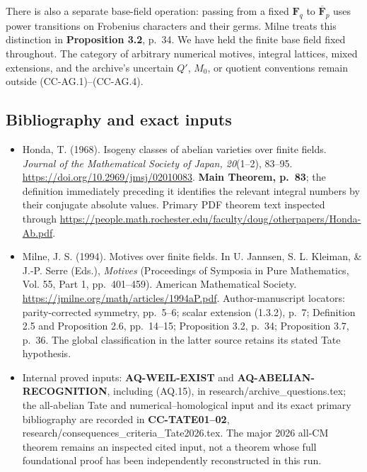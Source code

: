 \documentclass[11pt,a4paper]{article}
\providecommand{\tightlist}{\setlength{\itemsep}{0pt}\setlength{\parskip}{0pt}}
\theoremstyle{definition}\newtheorem{definition}[theorem]{Definition}
\theoremstyle{remark}\newtheorem{remark}[theorem]{Remark}
\begin{document}
There is also a separate base-field operation: passing from a fixed
\(\mathbf F_q\) to \(\overline{\mathbf F}_p\) uses power transitions on
Frobenius characters and their germs. Milne treats this distinction in
\textbf{Proposition 3.2}, p.~34. We have held the finite base field
fixed throughout. The category of arbitrary numerical motives, integral
lattices, mixed extensions, and the archive's uncertain \(Q'\), \(M_0\),
or quotient conventions remain outside (CC-AG.1)--(CC-AG.4).

\subsection{Bibliography and exact
inputs}\label{bibliography-and-exact-inputs}

\begin{itemize}
\tightlist
\item
  Honda, T. (1968). Isogeny classes of abelian varieties over finite
  fields. \emph{Journal of the Mathematical Society of Japan, 20}(1--2),
  83--95. \url{https://doi.org/10.2969/jmsj/02010083}. \textbf{Main Theorem,
  p.~83}; the definition immediately preceding it identifies the
  relevant integral numbers by their conjugate absolute values. Primary
  PDF theorem text inspected through
  \url{https://people.math.rochester.edu/faculty/doug/otherpapers/Honda-Ab.pdf}.
\item
  Milne, J. S. (1994). Motives over finite fields. In U. Jannsen, S. L.
  Kleiman, \& J.-P. Serre (Eds.), \emph{Motives} (Proceedings of
  Symposia in Pure Mathematics, Vol. 55, Part 1, pp.~401--459). American
  Mathematical Society. \url{https://jmilne.org/math/articles/1994aP.pdf}.
  Author-manuscript locators: parity-corrected symmetry, pp.~5--6;
  scalar extension (1.3.2), p.~7; Definition 2.5 and Proposition 2.6,
  pp.~14--15; Proposition 3.2, p.~34; Proposition 3.7, p.~36. The global
  classification in the latter source retains its stated Tate
  hypothesis.
\item
  Internal proved inputs: \textbf{AQ-WEIL-EXIST} and
  \textbf{AQ-ABELIAN-RECOGNITION}, including (AQ.15), in
  research/archive\_questions.tex; the all-abelian Tate and
  numerical--homological input and its exact primary bibliography are
  recorded in \textbf{CC-TATE01--02},
  research/consequences\_criteria\_Tate2026.tex. The major 2026 all-CM
  theorem remains an inspected cited input, not a theorem whose full
  foundational proof has been independently reconstructed in this run.
\end{itemize}
\end{document}
